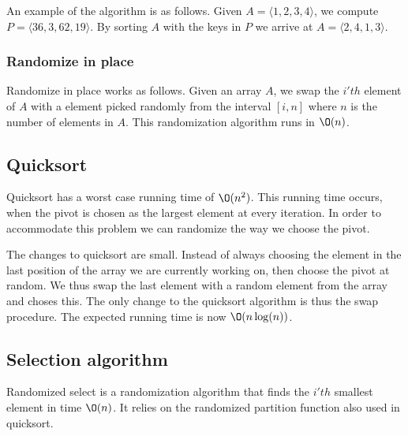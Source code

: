 \documentclass[10pt]{article}
\begin{document}
An example of the algorithm is as follows. Given $A = \langle 1,2,3,4\rangle$, we compute $P = \langle 36, 3, 62, 19\rangle$. By sorting $A$ with the keys in $P$ we arrive at $A = \langle 2, 4, 1, 3 \rangle$.

\subsubsection{Randomize in place} %
\label{ssub:randomize_in_place}
Randomize in place works as follows. Given an array $A$, we swap the $i'th$ element of $A$ with a element picked randomly from the interval $[i,n]$ where $n$ is the number of elements in $A$. This randomization algorithm runs in $\O(n)$.



\subsection{Quicksort} %
\label{sub:quicksort}
Quicksort has a worst case running time of $\O(n^2)$. This running time occurs, when the pivot is chosen as the largest element at every iteration. In order to accommodate this problem we can randomize the way we choose the pivot.

The changes to quicksort are small. Instead of always choosing the element in the last position of the array we are currently working on, then choose the pivot at random. We thus swap the last element with a random element from the array and choses this. The only change to the quicksort algorithm is thus the swap procedure. The expected running time is now $\O(n\log(n))$.


\subsection{Selection algorithm} %
\label{sub:selection_algorithm}
Randomized select is a randomization algorithm that finds the $i'th$ smallest element in time $\O(n)$. It relies on the randomized partition function also used in quicksort.
\end{document}
